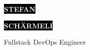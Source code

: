 \documentclass[10pt]{developercv} %
\begin{document}

\begin{minipage}[t]{0.47\textwidth} %
	\vspace{-\baselineskip} %

	\colorbox{black}{{\HUGE\textcolor{white}{\textbf{\MakeUppercase{Stefan}}}}} %

	\colorbox{black}{{\HUGE\textcolor{white}{\textbf{\MakeUppercase{Schärmeli}}}}} %

	\vspace{6pt} %

	{\LARGE Fullstack DevOps Engineer} %
\end{minipage}
\hfill %
\begin{minipage}[t]{0.25\textwidth} %
	\vspace{-\baselineskip} %

	\\
	\\
	\\
\end{minipage}
\hfill %
\end{document}

